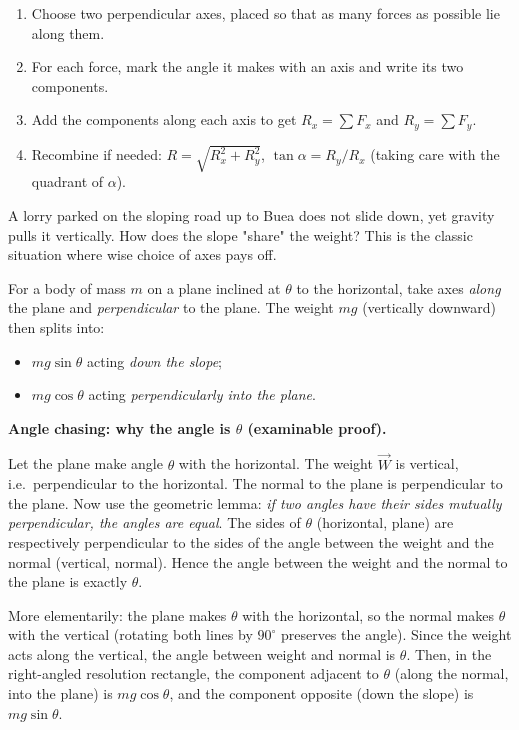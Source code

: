 \documentclass[11pt]{article}
\newcounter{popsec}
\newcounter{popsub}
\newcommand{\courssub}[1]{%
  \stepcounter{popsub}%
  \par\vspace{9pt}\noindent{\popxbold\fontsize{11.5}{13}\selectfont\color{popink}{\color{poporange}\thepopsec.\thepopsub}\hspace{6pt}#1}\par\nopagebreak\vspace{4pt}
}
\begin{document}
\begin{methode}
\begin{enumerate}
\item Choose two perpendicular axes, placed so that as many forces as possible lie along them.
\item For each force, mark the angle it makes with an axis and write its two components.
\item Add the components along each axis to get $R_x = \sum F_x$ and $R_y = \sum F_y$.
\item Recombine if needed: $R = \sqrt{R_x^2 + R_y^2}$, $\tan\alpha = R_y/R_x$ (taking care with the quadrant of $\alpha$).
\end{enumerate}
\end{methode}

\courssub{Resolution on an Inclined Plane}

A lorry parked on the sloping road up to Buea does not slide down, yet gravity pulls it vertically. How does the slope "share" the weight? This is the classic situation where wise choice of axes pays off.

\begin{methode}
For a body of mass $m$ on a plane inclined at $\theta$ to the horizontal, take axes \emph{along} the plane and \emph{perpendicular} to the plane. The weight $mg$ (vertically downward) then splits into:
\begin{itemize}
\item $mg\sin\theta$ acting \emph{down the slope};
\item $mg\cos\theta$ acting \emph{perpendicularly into the plane}.
\end{itemize}
\end{methode}

\textbf{Angle chasing: why the angle is $\theta$ (examinable proof).}\par
Let the plane make angle $\theta$ with the horizontal. The weight $\vec{W}$ is vertical, i.e.\ perpendicular to the horizontal. The normal to the plane is perpendicular to the plane. Now use the geometric lemma: \emph{if two angles have their sides mutually perpendicular, the angles are equal}. The sides of $\theta$ (horizontal, plane) are respectively perpendicular to the sides of the angle between the weight and the normal (vertical, normal). Hence the angle between the weight and the normal to the plane is exactly $\theta$.

More elementarily: the plane makes $\theta$ with the horizontal, so the normal makes $\theta$ with the vertical (rotating both lines by $90^\circ$ preserves the angle). Since the weight acts along the vertical, the angle between weight and normal is $\theta$. Then, in the right-angled resolution rectangle, the component adjacent to $\theta$ (along the normal, into the plane) is $mg\cos\theta$, and the component opposite (down the slope) is $mg\sin\theta$.
\end{document}
